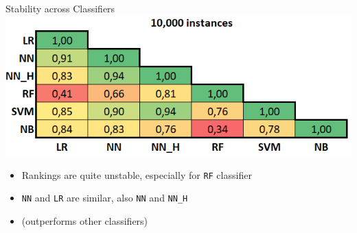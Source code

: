 \documentclass[accentcolor=tud1a,colorbacktitle,inverttitle,landscape,german,presentation,t]{tudbeamer}
\begin{document}
\begin{frame}{Stability across Classifiers}{}
	\vspace*{-4mm}
	\centering
	\includegraphics[scale=0.4]{images/corr_wc_en_10000}

	\vspace*{5mm}

	\begin{itemize}\setlength\itemsep{1em}
		\item Rankings are quite unstable, especially for \texttt{RF} classifier
		\item \texttt{NN} and \texttt{LR} are similar, also \texttt{NN} and \texttt{NN\_H}
		\item {} (outperforms other classifiers)
	\end{itemize}
\end{frame}
\end{document}
